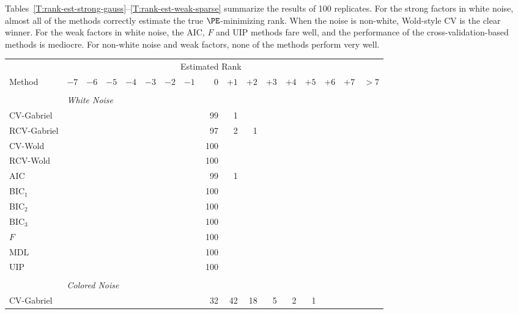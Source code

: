 Tables~\ref{T:rank-est-strong-gauss}--\ref{T:rank-est-weak-sparse} summarize
the results of 100 replicates.  For the strong factors in white noise, almost
all of the methods correctly estimate the true $\PE$-minimizing rank.  When the noise is non-white, Wold-style CV is the clear winner.  For the weak factors in white noise, the AIC, $F$ and UIP methods fare well, and the performance of the cross-validation-based methods is mediocre.  For non-white noise and weak factors, none of the methods perform very well.

\begin{table}
    \tiny
    \centering    
    \begin{tabular}{lrrrrrrrrrrrrrrrr}
        \toprule
        &\multicolumn{15}{c}{\scriptsize{Estimated Rank}} \\
        \cmidrule{2-17}
        \scriptsize{Method}
            & $-7$ & $-6$ & $-5$ & $-4$ & $-3$ & $-2$ & $-1$ 
            & $\phantom{+}0$ 
            & $+1$ & $+2$ & $+3$ & $+4$ & $+5$ & $+6$ & $+7$ & $> 7$ \\
        \midrule
        \\
        &\multicolumn{16}{l}{\scriptsize{\textit{White Noise}}} \\
 CV-Gabriel &  &  &  &  &  &  &  &  99 &  1 &  &  &  &  &  &  & \\ 
 RCV-Gabriel &  &  &  &  &  &  &  &  97 &  2 &  1 &  &  &  &  &  & \\ 
 CV-Wold &  &  &  &  &  &  &  &  100 &  &  &  &  &  &  &  & \\ 
 RCV-Wold &  &  &  &  &  &  &  &  100 &  &  &  &  &  &  &  & \\ 
 AIC &  &  &  &  &  &  &  &  99 &  1 &  &  &  &  &  &  & \\ 
 BIC$_1$ &  &  &  &  &  &  &  &  100 &  &  &  &  &  &  &  & \\ 
 BIC$_2$ &  &  &  &  &  &  &  &  100 &  &  &  &  &  &  &  & \\ 
 BIC$_3$ &  &  &  &  &  &  &  &  100 &  &  &  &  &  &  &  & \\ 
 $F$ &  &  &  &  &  &  &  &  100 &  &  &  &  &  &  &  & \\ 
 MDL &  &  &  &  &  &  &  &  100 &  &  &  &  &  &  &  & \\ 
 UIP &  &  &  &  &  &  &  &  100 &  &  &  &  &  &  &  & \\ 
         \\
        &\multicolumn{16}{l}{\scriptsize{\textit{Colored Noise}}} \\
CV-Gabriel &  &  &  &  &  &  &  &  32 &  42 &  18 &  5 &  2 &  1 &  &  & \\ 

\end{tabular}
\end{table}
